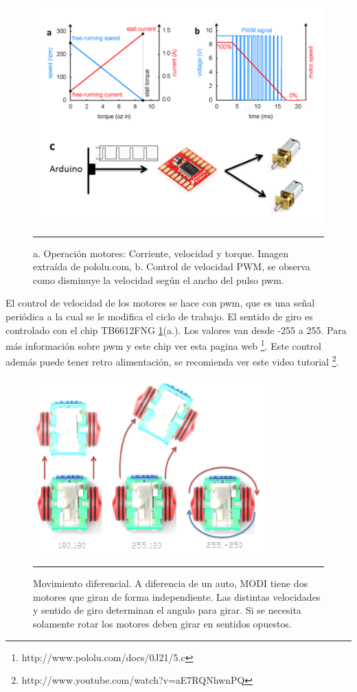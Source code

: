 \begin{figure}[htbp]
	\centering
		\includegraphics[width=\textwidth]{./Figures/graficosMotores.png}
		\rule{35em}{0.5pt}
	\caption[Gráficos Motor DC]{a. Operación motores: Corriente, velocidad y torque. Imagen extraída de pololu.com, b. Control de velocidad PWM, se observa como disminuye la velocidad según el ancho del pulso pwm.}
	\label{fig:DCMotor}
\end{figure}

El control de velocidad de los motores se hace con pwm, que es una señal periódica a la cual se le modifica el ciclo de trabajo. El sentido de giro es controlado con el chip TB6612FNG \ref{fig:DCMotor}(a.). Los valores van desde -255 a 255. Para más información sobre pwm y este chip ver esta pagina web \footnote{http://www.pololu.com/docs/0J21/5.c}. Este control además puede tener retro alimentación, se recomienda ver este video tutorial \footnote{http://www.youtube.com/watch?v=aE7RQNhwnPQ}.

\begin{figure}[htbp]
	\centering
		\includegraphics[width=0.8\textwidth]{./Figures/MODI/pwm.png}
		\rule{35em}{0.5pt}
	\caption[pwm]{Movimiento diferencial. A diferencia de un auto, MODI tiene dos motores que giran de forma independiente. Las distintas velocidades y sentido de giro determinan el angulo para girar. Si se necesita solamente rotar los motores deben girar en sentidos opuestos.}
	\label{fig:pwm}
\end{figure}

